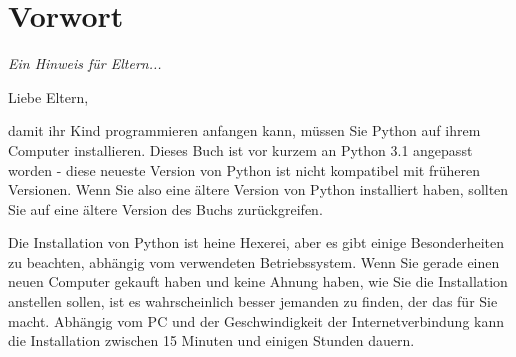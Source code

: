 

\chapter*{Vorwort}\normalsize
\begin{center}
{\em Ein Hinweis für Eltern...}
\end{center}
\pagestyle{plain}

\noindent
Liebe Eltern,

damit ihr Kind programmieren anfangen kann, müssen Sie Python auf ihrem Computer installieren. Dieses Buch ist vor kurzem an Python 3.1 angepasst worden - diese neueste Version von Python ist nicht kompatibel mit früheren Versionen. Wenn Sie also eine ältere Version von Python installiert haben, sollten Sie auf eine ältere Version des Buchs zurückgreifen.

Die Installation von Python ist heine Hexerei, aber es gibt einige Besonderheiten zu beachten, abhängig vom verwendeten Betriebssystem. Wenn Sie gerade einen neuen Computer gekauft haben und keine Ahnung haben, wie Sie die Installation anstellen sollen, ist es wahrscheinlich besser jemanden zu finden, der das für Sie macht. Abhängig vom PC und der Geschwindigkeit der Internetverbindung kann die Installation zwischen 15 Minuten und einigen Stunden dauern.

